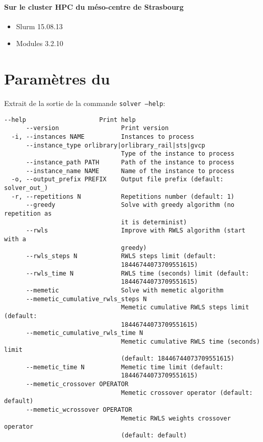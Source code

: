\documentclass[a4paper,11pt,twoside,french,report]{../common/simplem}
\begin{document}
			\paragraph*{Sur le cluster \gls{HPC} du méso-centre de Strasbourg}
				\begin{itemize}
					\item Slurm 15.08.13
					\item Modules 3.2.10
				\end{itemize}
		\newpage\section{Paramètres du \solver{}}\label{sec:solver_parameters}
			Extrait de la sortie de la commande \texttt{solver --help}:
			\begin{Verbatim}[frame=single]
      --help                    Print help
      --version                 Print version
  -i, --instances NAME          Instances to process
      --instance_type orlibrary|orlibrary_rail|sts|gvcp
                                Type of the instance to process
      --instance_path PATH      Path of the instance to process
      --instance_name NAME      Name of the instance to process
  -o, --output_prefix PREFIX    Output file prefix (default: solver_out_)
  -r, --repetitions N           Repetitions number (default: 1)
      --greedy                  Solve with greedy algorithm (no repetition as
                                it is determinist)
      --rwls                    Improve with RWLS algorithm (start with a
                                greedy)
      --rwls_steps N            RWLS steps limit (default:
                                18446744073709551615)
      --rwls_time N             RWLS time (seconds) limit (default:
                                18446744073709551615)
      --memetic                 Solve with memetic algorithm
      --memetic_cumulative_rwls_steps N
                                Memetic cumulative RWLS steps limit (default:
                                18446744073709551615)
      --memetic_cumulative_rwls_time N
                                Memetic cumulative RWLS time (seconds) limit
                                (default: 18446744073709551615)
      --memetic_time N          Memetic time limit (default:
                                18446744073709551615)
      --memetic_crossover OPERATOR
                                Memetic crossover operator (default: default)
      --memetic_wcrossover OPERATOR
                                Memetic RWLS weights crossover operator
                                (default: default)
			\end{Verbatim}
	\makeutbmbackcover{}
\end{document}
